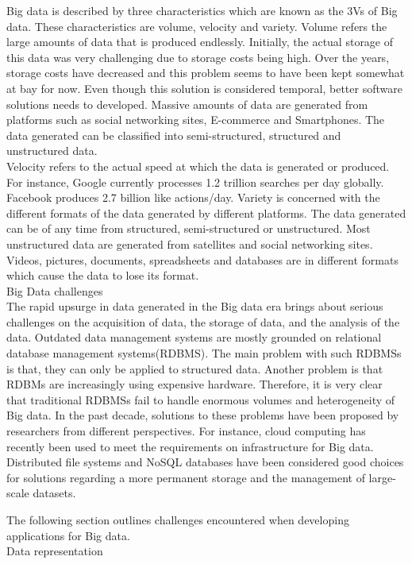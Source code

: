 \documentclass[conference]{IEEEtran}
\begin{document}
Big data is described by three characteristics which are known as the 3Vs of Big data. These characteristics are volume, velocity and variety. Volume refers the large amounts of data that is produced endlessly. Initially, the actual storage of this data was very challenging due to storage costs being high. Over the years, storage costs have decreased and this problem seems to have been kept somewhat at bay for now. Even though this solution is considered temporal, better software solutions needs to developed. Massive amounts of data are generated from platforms such as social networking sites, E-commerce and Smartphones. The data generated can be classified into semi-structured, structured and unstructured data.\\
Velocity refers to the actual speed at which the data is generated or produced. For instance, Google currently processes 1.2 trillion searches per day globally. Facebook produces 2.7 billion like actions/day. Variety is concerned with the different formats of the data generated by different platforms. The data generated can be of any time from structured, semi-structured or unstructured. Most unstructured data are generated from satellites and social networking sites. Videos, pictures, documents, spreadsheets and databases are in different formats which cause the data to lose its format. \\

Big Data challenges\\
The rapid upsurge in data generated in the Big data era brings about serious challenges on the acquisition of data, the storage of data, and the analysis of the data. Outdated data management systems are mostly grounded on relational database management systems(RDBMS). The main problem with such RDBMSs is that, they can only be applied to structured data. Another problem is that RDBMs are increasingly using expensive hardware. Therefore, it is very clear that traditional RDBMSs fail to handle enormous volumes and heterogeneity of Big data.
In the past decade, solutions to these problems have been proposed by researchers from different perspectives. For instance, cloud computing has recently been used to meet the requirements on infrastructure for Big data. Distributed file systems and NoSQL databases have been considered good choices for solutions regarding a more permanent storage and the management of large-scale datasets.

The following section outlines challenges encountered when developing applications for Big data. \\
Data representation \\
\end{document}
